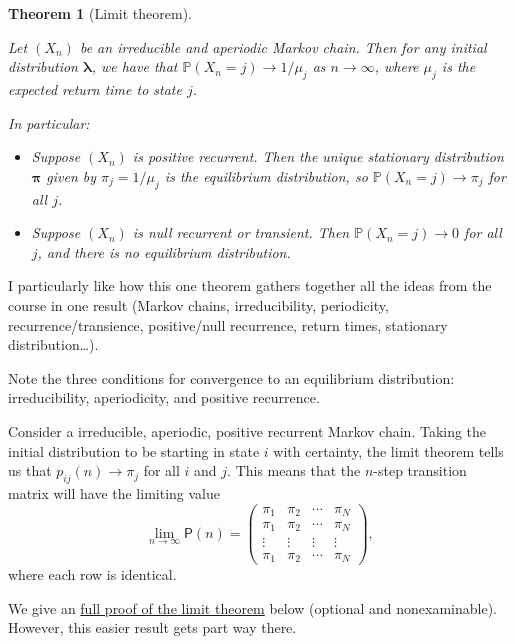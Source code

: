 \documentclass[
  a4paper,
]{article}
\providecommand{\tightlist}{%
  \setlength{\itemsep}{0pt}\setlength{\parskip}{0pt}}
\newtheorem{theorem}{Theorem}[section]
\theoremstyle{definition}
\theoremstyle{definition}
\theoremstyle{definition}
\theoremstyle{remark}
\begin{document}
\begin{theorem}[Limit theorem]
\protect\hypertarget{thm:limit}{}\label{thm:limit}

Let \((X_n)\) be an irreducible and aperiodic Markov chain. Then for any initial distribution \(\boldsymbol\lambda\), we have that \(\mathbb P(X_n = j) \to 1/\mu_j\) as \(n \to \infty\), where \(\mu_j\) is the expected return time to state \(j\).

In particular:

\begin{itemize}
\tightlist
\item
  Suppose \((X_n)\) is positive recurrent. Then the unique stationary distribution \(\boldsymbol\pi\) given by \(\pi_j = 1/\mu_j\) is the equilibrium distribution, so \(\mathbb P(X_n = j) \to \pi_j\) for all \(j\).
\item
  Suppose \((X_n)\) is null recurrent or transient. Then \(\mathbb P(X_n = j) \to 0\) for all \(j\), and there is no equilibrium distribution.
\end{itemize}

\end{theorem}

I particularly like how this one theorem gathers together all the ideas from the course in one result (Markov chains, irreducibility, periodicity, recurrence/transience, positive/null recurrence, return times, stationary distribution\ldots).

Note the three conditions for convergence to an equilibrium distribution: irreducibility, aperiodicity, and positive recurrence.

Consider a irreducible, aperiodic, positive recurrent Markov chain. Taking the initial distribution to be starting in state \(i\) with certainty, the limit theorem tells us that \(p_{ij}(n) \to \pi_j\) for all \(i\) and \(j\). This means that the \(n\)-step transition matrix will have the limiting value
\[ \lim_{n \to \infty} \mathsf P(n) = \begin{pmatrix}
     \pi_1 & \pi_2 & \cdots & \pi_N \\
     \pi_1 & \pi_2 & \cdots & \pi_N \\
     \vdots & \vdots & \vdots & \vdots \\
     \pi_1 & \pi_2 & \cdots & \pi_N \end{pmatrix} , \]
where each row is identical.

We give an \protect\hyperlink{S11-proofs}{full proof of the limit theorem} below (optional and nonexaminable). However, this easier result gets part way there.
\end{document}
